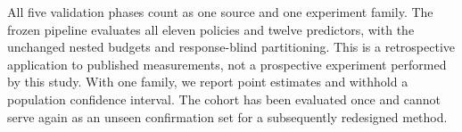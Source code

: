 All five validation phases count as one source and one experiment family. The frozen pipeline evaluates all eleven policies and twelve predictors, with the unchanged nested budgets and response-blind partitioning. This is a retrospective application to published measurements, not a prospective experiment performed by this study. With one family, we report point estimates and withhold a population confidence interval. The cohort has been evaluated once and cannot serve again as an unseen confirmation set for a subsequently redesigned method.
